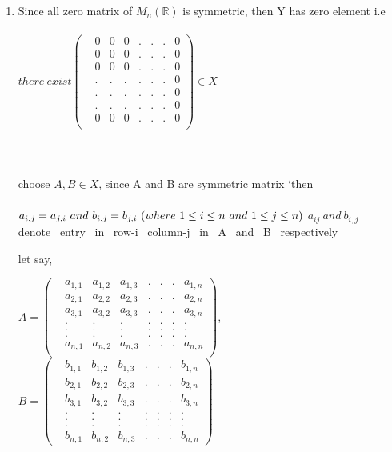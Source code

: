 \documentclass[45pt]{article}
\begin{document}
\begin{enumerate}
\item Since all zero matrix of $M_n(\mathbb{R})$  is symmetric, then Y has zero element i.e \\ \\
$ there ~ exist \begin{pmatrix}
    & 0 & 0 & 0 &.&.&.& 0 \\
    & 0 & 0 & 0 &.&.&.& 0\\
    & 0 & 0 & 0 &.&.&.& 0\\
    & . & . & . &.&.&.& 0\\
    & . & . & . &.&.&.& 0\\
    & . & . & . &.&.&.& 0\\
    & 0 & 0 & 0 &.&.&.& 0\\
    \end{pmatrix} 
    \in X
      $ \\\\
 \\ \\ 

choose $A, B \in X $, since A and B are symmetric matrix     `then \\\\
$ a_{i,j}=a_{j,i} ~ and ~ b_{i,j}=b_{j,i} ~ (where ~ 1 \leq i \leq n ~and ~1 \leq j \leq n )\\$
$a_{ij} ~ and ~ b_{i,j}$~ denote~ entry~ in~ row-i ~column-j ~in ~A~ and ~B~ respectively

let say,

$A= \begin{pmatrix}
    & a_{1,1} & a_{1,2} & a_{1,3} &.&.&.& a_{1,n}  \\
    & a_{2,1} & a_{2,2} & a_{2,3} &.&.&.& a_{2,n}  \\
    & a_{3,1} & a_{3,2} & a_{3,3} &.&.&.& a_{3,n}  \\
    & . & . & . &.&.&.&.\\
    & . & . & . &.&.&.&.\\
    & . & . & . &.&.&.&.\\
    & a_{n,1} & a_{n,2} & a_{n,3} &.&.&.& a_{n,n}  \\
    \end{pmatrix}$, $
    B=\begin{pmatrix}
        & b_{1,1} & b_{1,2} & b_{1,3} &.&.&.& b_{1,n}  \\
        & b_{2,1} & b_{2,2} & b_{2,3} &.&.&.& b_{2,n}  \\
        & b_{3,1} & b_{3,2} & b_{3,3} &.&.&.& b_{3,n}  \\
        & . & . & . &.&.&.&.\\
        & . & . & . &.&.&.&.\\
        & . & . & . &.&.&.&.\\
        & b_{n,1} & b_{n,2} & b_{n,3} &.&.&.& b_{n,n} 
     \end{pmatrix}
    $\\\\



\end{enumerate}
\end{document}
